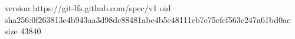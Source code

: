 version https://git-lfs.github.com/spec/v1
oid sha256:0f263813e4b943aa3d98dc88481abe4b5e48111cb7e75efcf563c247a61bd0ac
size 43840
